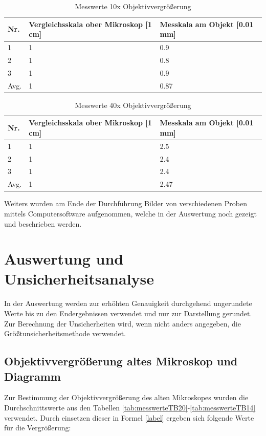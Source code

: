 \documentclass[12pt,a4paper,twoside]{article}
\begin{document}
\begin{table}[H]
    \centering
    \caption{Messwerte 10x Objektivvergrößerung}
    \label{tab:messwerteNM10x}
    \begin{tabular}{| l | l | l |}
        \hline
        Nr.   & Vergleichsskala ober Mikroskop [1 cm]  & Messkala am Objekt [0.01 mm] \\
        \hline
        1 & 1 & 0.9 \\
        2 & 1 & 0.8 \\
        3 & 1 & 0.9 \\
        \hline
        Avg. & 1 & 0.87 \\
        \hline
    \end{tabular}
\end{table}

\begin{table}[H]
    \centering
    \caption{Messwerte 40x Objektivvergrößerung}
    \label{tab:messwerteNM40x}
    \begin{tabular}{| l | l | l |}
        \hline
        Nr.   & Vergleichsskala ober Mikroskop [1 cm]  & Messkala am Objekt [0.01 mm] \\
        \hline
        1 & 1 & 2.5 \\
        2 & 1 & 2.4 \\
        3 & 1 & 2.4 \\
        \hline
        Avg. & 1 & 2.47 \\
        \hline
    \end{tabular}
\end{table}

\noindent
Weiters wurden am Ende der Durchführung Bilder von verschiedenen Proben mittels Computersoftware  aufgenommen, welche in der Auswertung noch gezeigt und beschrieben werden.


\section{Auswertung und Unsicherheitsanalyse} %

In der Auswertung werden zur erhöhten Genauigkeit durchgehend ungerundete Werte bis zu den Endergebnissen verwendet und nur zur Darstellung gerundet. \\
Zur Berechnung der Unsicherheiten wird, wenn nicht anders angegeben, die Größtunsicherheitsmethode verwendet.

\subsection{Objektivvergrößerung altes Mikroskop und Diagramm}
Zur Bestimmung der Objektivvergrößerung des alten Mikroskopes wurden die Durchschnittswerte aus den Tabellen \ref{tab:messwerteTB20}-\ref{tab:messwerteTB14} verwendet.
Durch einsetzen dieser in Formel \ref*{label} ergeben sich folgende Werte für die Vergrößerung:
\end{document}
